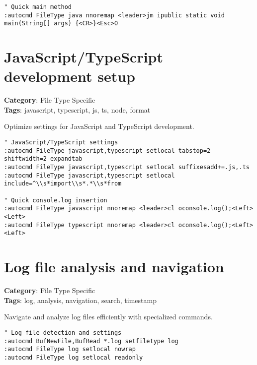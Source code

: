 {{{{{{\begin{Exa*}{}
\begin{Verbatim}[fontsize=\footnotesize, breaklines, breakanywhere]
" Quick main method
:autocmd FileType java nnoremap <leader>jm ipublic static void main(String[] args) {<CR>}<Esc>O
\end{Verbatim}
\end{Exa*}

\section{JavaScript/TypeScript development setup}

\textbf{Category}: File Type Specific\\ \textbf{Tags}: javascript, typescript, js, ts, node, format
\vspace{0.5cm}

Optimize settings for JavaScript and TypeScript development.

\begin{Exa*}{}
\begin{Verbatim}[fontsize=\footnotesize, breaklines, breakanywhere]
" JavaScript/TypeScript settings
:autocmd FileType javascript,typescript setlocal tabstop=2 shiftwidth=2 expandtab
:autocmd FileType javascript,typescript setlocal suffixesadd+=.js,.ts
:autocmd FileType javascript,typescript setlocal include=^\\s*import\\s*.*\\s*from

" Quick console.log insertion
:autocmd FileType javascript nnoremap <leader>cl oconsole.log();<Left><Left>
:autocmd FileType typescript nnoremap <leader>cl oconsole.log();<Left><Left>
\end{Verbatim}
\end{Exa*}

\section{Log file analysis and navigation}

\textbf{Category}: File Type Specific\\ \textbf{Tags}: log, analysis, navigation, search, timestamp
\vspace{0.5cm}

Navigate and analyze log files efficiently with specialized commands.

\begin{Exa*}{}
\begin{Verbatim}[fontsize=\footnotesize, breaklines, breakanywhere]
" Log file detection and settings
:autocmd BufNewFile,BufRead *.log setfiletype log
:autocmd FileType log setlocal nowrap
:autocmd FileType log setlocal readonly


\end{Verbatim}
\end{Exa*}}}}}}}
